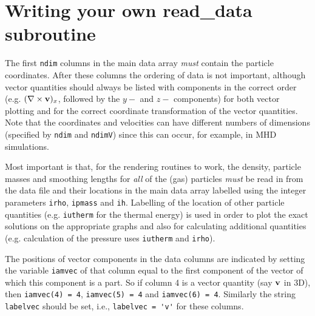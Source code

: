 \documentclass[a4paper,10pt]{article}
\begin{document}
\newpage

\section{Writing your own read\_data subroutine}
\label{sec:writeyourown}
The first \verb+ndim+ columns in the main data array \emph{must} contain the particle coordinates.
After these columns the ordering of data is not important, although vector quantities should
always be listed with components in the correct order (e.g. $(\nabla\times {\bf v})_x$,
followed by the $y-$ and $z-$ components) for both vector plotting and for the
correct coordinate transformation of the vector quantities. Note that the coordinates and velocities can have different
numbers of dimensions (specified by \verb+ndim+ and \verb+ndimV+) since this can occur, for example, in MHD simulations.

Most important is that, for the rendering routines to work, the density, particle
masses and smoothing lengths for \emph{all} of the (gas) particles \emph{must} be read in from
the data file and their locations in the main data array labelled using the integer
parameters \verb+irho+, \verb+ipmass+ and \verb+ih+. Labelling of the location of other particle
quantities (e.g. \verb+iutherm+ for the thermal energy) is used in
order to plot the exact solutions on the appropriate graphs and also for calculating
additional quantities (e.g. calculation of the pressure uses \verb+iutherm+ and
\verb+irho+).

 The positions of vector components in the data columns are indicated by setting the variable \verb+iamvec+ of that
column equal to the first component of the vector of which this component is a part. So if column 4
is a vector quantity (say ${\bf v}$ in 3D), then \verb+iamvec(4) = 4+, \verb+iamvec(5) = 4+ and
\verb+iamvec(6) = 4+. Similarly the string \verb+labelvec+ should be set, i.e., \verb+labelvec = 'v'+ for these columns.



\end{document}
